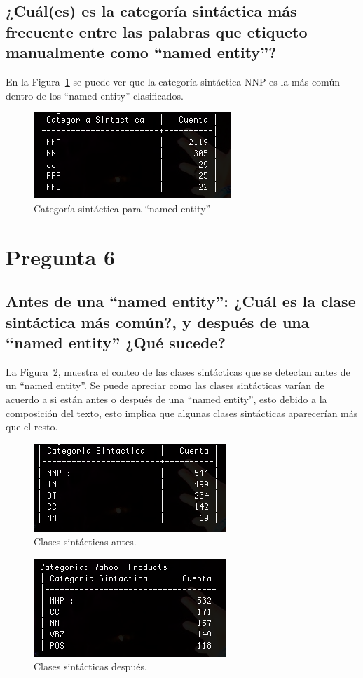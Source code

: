 \documentclass{article}
\begin{document}
\newpage
\subsection{¿Cuál(es) es la categoría sintáctica más frecuente entre las palabras que etiqueto manualmente como ``named entity''?}
En la Figura~\ref{fig:pregunta5d} se puede ver que la categoría sintáctica NNP es la más común dentro de los ``named entity'' clasificados.
\begin{figure}[h!]
\centering
\includegraphics[scale=0.5]{figuras/pregunta5d.png}
\caption{Categoría sintáctica para ``named entity''}
\label{fig:pregunta5d}
\end{figure}


\section{Pregunta 6}
\subsection{Antes de una ``named entity'': ¿Cuál es la clase sintáctica más común?, y después de una ``named entity'' ¿Qué sucede?}
La Figura~\ref{fig:pregunta6}, muestra el conteo de las clases sintácticas que se detectan antes de un ``named entity''. Se puede apreciar como las clases sintácticas varían de acuerdo a si están antes o después de una ``named entity'', esto debido a la composición del texto, esto implica que algunas clases sintácticas aparecerían más que el resto.
\begin{figure}[h!]
\centering
\includegraphics[scale=0.6]{figuras/pregunta6.png}
\caption{Clases sintácticas antes.}
\label{fig:pregunta6}
\end{figure}
\begin{figure}[h!]
\centering
\includegraphics[scale=0.6]{figuras/pregunta6b.png}
\caption{Clases sintácticas después.}
\label{fig:pregunta6b}
\end{figure}
\end{document}
